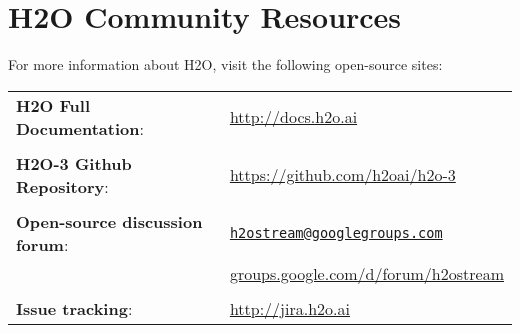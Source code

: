 \section{H2O Community Resources}
\begin{singlespacing}

For more information about H2O, visit the following open-source sites:

\begin{tabular}{l l}
{\textbf{H2O Full Documentation}}: & \url{http://docs.h2o.ai} \\
\\
{\textbf{H2O-3 Github Repository}}: & \url{https://github.com/h2oai/h2o-3} \\
\\
{\textbf{Open-source discussion forum}}: & \href{mailto:h2ostream@googlegroups.com}{\texttt{h2ostream@googlegroups.com}} \\
& \url{groups.google.com/d/forum/h2ostream} \\
\\
{\textbf{Issue tracking}}: & \url{http://jira.h2o.ai}
\end{tabular}

\end{singlespacing}
\bigskip

